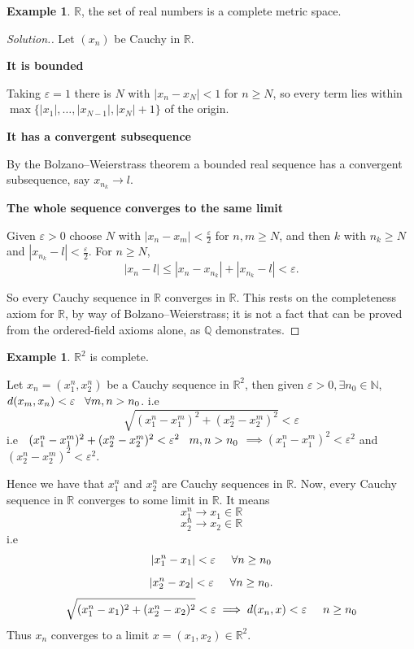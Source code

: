 \documentclass[11pt,a4paper]{article}
\theoremstyle{definition}
\newtheorem{exa}[thm]{Example}
\newenvironment{solution}
  {\renewcommand{\qedsymbol}{}\begin{proof}[\textit{Solution}.]}
  {\end{proof}}
\newcommand{\subhead}[1]{%
  \par\medskip\noindent\textbf{#1}\par\nobreak\smallskip}
\begin{document}
\begin{exa}
$\mathbb{R}$, the set of real numbers is a complete metric space.

\end{exa}

\begin{solution}
Let $(x_n)$ be Cauchy in $\mathbb{R}$.

\subhead{It is bounded}
Taking $\varepsilon=1$ there is $N$ with $|x_n-x_N|<1$ for $n\geq N$, so every
term lies within $\max\{|x_1|,\dots,|x_{N-1}|,|x_N|+1\}$ of the origin.

\subhead{It has a convergent subsequence}
By the Bolzano--Weierstrass theorem a bounded real sequence has a convergent
subsequence, say $x_{n_k}\rightarrow l$.

\subhead{The whole sequence converges to the same limit}
Given $\varepsilon>0$ choose $N$ with $|x_n-x_m|<\frac{\varepsilon}{2}$ for
$n,m\geq N$, and then $k$ with $n_k\geq N$ and
$|x_{n_k}-l|<\frac{\varepsilon}{2}$. For $n\geq N$,
$$|x_n-l|\leq|x_n-x_{n_k}|+|x_{n_k}-l|<\varepsilon .$$

So every Cauchy sequence in $\mathbb{R}$ converges in $\mathbb{R}$. This rests
on the completeness axiom for $\mathbb{R}$, by way of Bolzano--Weierstrass; it
is not a fact that can be proved from the ordered-field axioms alone, as
$\mathbb{Q}$ demonstrates.
\end{solution}


\begin{exa}
$\mathbb{R}^2$ is complete.

Let $x_n=(x^n_1,x^n_2)$ be a Cauchy sequence in $\mathbb{R}^2$, then given $\varepsilon >0,\exists n_0\in \mathbb{N}$,\\ $d(x_m,x_n)<\varepsilon \hspace{0.3cm} \forall m,n>n_0$. i.e $$\sqrt{(x^n_1-x_1^m)^2+(x^n_2-x^m_2)^2}<\varepsilon$$ i.e $\hspace{0.2cm}(x_1^n-x_1^m)^2+(x_2^n-x_2^m)^2<\varepsilon^2\hspace{0.3cm} m,n>n_0$
 $\implies (x_1^n-x_1^m)^2<\varepsilon^2$ and $(x_2^n-x_2^m)^2<\varepsilon^2$.

Hence we have that $x^n_1$ and $x_2^n$ are Cauchy sequences in $\mathbb{R}$. Now, every Cauchy sequence in $\mathbb{R}$ converges to some limit in $\mathbb{R}$. It means $$x_1^n\rightarrow x_1\in \mathbb{R}$$ $$x^n_2\rightarrow x_2\in \mathbb{R}$$ i.e $$|x^n_1-x_1|<\varepsilon \hspace{0.5cm} \forall n\geq n_0$$ $$|x^n_2-x_2|<\varepsilon \hspace{0.5cm} \forall n\geq n_0.$$  $$\sqrt{(x^n_1-x_1)^2+(x^n_2-x_2)^2}<\varepsilon\implies d(x_n,x)<\varepsilon \hspace{0.5cm} n\geq n_0$$ Thus $x_n$ converges to a limit $x=(x_1,x_2)\in \mathbb{R}^2$.
\end{exa}
\end{document}
